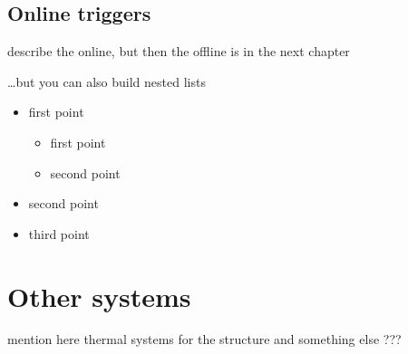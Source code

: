 \subsection[Online triggers]{Online triggers}

describe the online, but then the offline is in the next chapter

\noindent
\dots but you can also build nested lists
\begin{itemize}
\item first point
	\begin{itemize} %
	\item first point
	\item second point
	\end{itemize}
\item second point
\item third point \\
\end{itemize}




\section[Other systems]{Other systems}

mention here thermal systems for the structure and something else ???

